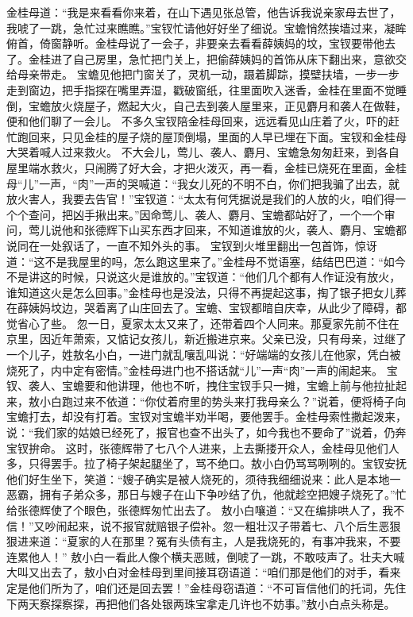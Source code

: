 \documentclass[12pt,oneside]{book}
\begin{document}
金桂母道：“我是来看看你来着，在山下遇见张总管，他告诉我说亲家母去世了，我唬了一跳，急忙过来瞧瞧。”宝钗忙请他好好坐了细说。宝蟾悄然挨墙过来，凝眸俯首，倚窗静听。金桂母说了一会子，非要亲去看看薛姨妈的坟，宝钗要带他去了。金桂进了自己房里，急忙把门关上，把偷薛姨妈的首饰从床下翻出来，意欲交给母亲带走。
宝蟾见他把门窗关了，灵机一动，蹑着脚踪，摸壁扶墙，一步一步走到窗边，把手指探在嘴里弄湿，戳破窗纸，往里面吹入迷香，金桂在里面不觉睡倒，宝蟾放火烧屋子，燃起大火，自己去到袭人屋里来，正见麝月和袭人在做鞋，便和他们聊了一会儿。
不多久宝钗陪金桂母回来，远远看见山庄着了火，吓的赶忙跑回来，只见金桂的屋子烧的屋顶倒塌，里面的人早已埋在下面。宝钗和金桂母大哭着喊人过来救火。
不大会儿，莺儿、袭人、麝月、宝蟾急匆匆赶来，到各自屋里端水救火，只闹腾了好大会，才把火泼灭，再一看，金桂已烧死在里面，金桂母“儿”一声，“肉”一声的哭喊道：“我女儿死的不明不白，你们把我骗了出去，就放火害人，我要去告官！”宝钗道：“太太有何凭据说是我们的人放的火，咱们得一个个查问，把凶手揪出来。”因命莺儿、袭人、麝月、宝蟾都站好了，一个一个审问，莺儿说他和张德辉下山买东西才回来，不知道谁放的火，袭人、麝月、宝蟾都说同在一处叙话了，一直不知外头的事。
宝钗到火堆里翻出一包首饰，惊讶道：“这不是我屋里的吗，怎么跑这里来了。”金桂母不觉语塞，结结巴巴道：“如今不是讲这的时候，只说这火是谁放的。”宝钗道：“他们几个都有人作证没有放火，谁知道这火是怎么回事。”金桂母也是没法，只得不再提起这事，掏了银子把女儿葬在薛姨妈坟边，哭着离了山庄回去了。宝蟾、宝钗都暗自庆幸，从此少了障碍，都觉省心了些。
忽一日，夏家太太又来了，还带着四个人同来。那夏家先前不住在京里，因近年萧索，又惦记女孩儿，新近搬进京来。父亲已没，只有母亲，过继了一个儿子，姓敖名小白，一进门就乱嚷乱叫说：“好端端的女孩儿在他家，凭白被烧死了，内中定有密情。”金桂母进门也不搭话就“儿”一声“肉”一声的闹起来。
宝钗、袭人、宝蟾要和他讲理，他也不听，拽住宝钗手只一摊，宝蟾上前与他拉扯起来，敖小白跑过来不依道：“你仗着府里的势头来打我母亲么？”说着，便将椅子向宝蟾打去，却没有打着。宝钗对宝蟾半劝半喝，要他罢手。金桂母索性撒起泼来，说：“我们家的姑娘已经死了，报官也查不出头了，如今我也不要命了”说着，仍奔宝钗拚命。
这时，张德辉带了七八个人进来，上去撕搂开众人，金桂母见他们人多，只得罢手。拉了椅子架起腿坐了，骂不绝口。敖小白仍骂骂咧咧的。宝钗安抚他们好生坐下，笑道：“嫂子确实是被人烧死的，须待我细细说来：此人是本地一恶霸，拥有子弟众多，那日与嫂子在山下争吵结了仇，他就趁空把嫂子烧死了。”忙给张德辉使了个眼色，张德辉匆忙出去了。
敖小白嚷道：“又在编排哄人了，我不信！”又吵闹起来，说不报官就赔银子偿补。忽一粗壮汉子带着七、八个后生恶狠狠进来道：“夏家的人在那里？冤有头债有主，人是我烧死的，有事冲我来，不要连累他人！”
敖小白一看此人像个横夫恶贼，倒唬了一跳，不敢吱声了。壮夫大喊大叫又出去了，敖小白对金桂母到里间接耳窃语道：“咱们那是他们的对手，看来定是他们所为了，咱们还是回去罢！”金桂母窃语道：“不可盲信他们的托词，先住下两天察探察探，再把他们各处银两珠宝拿走几许也不妨事。”敖小白点头称是。
\end{document}
